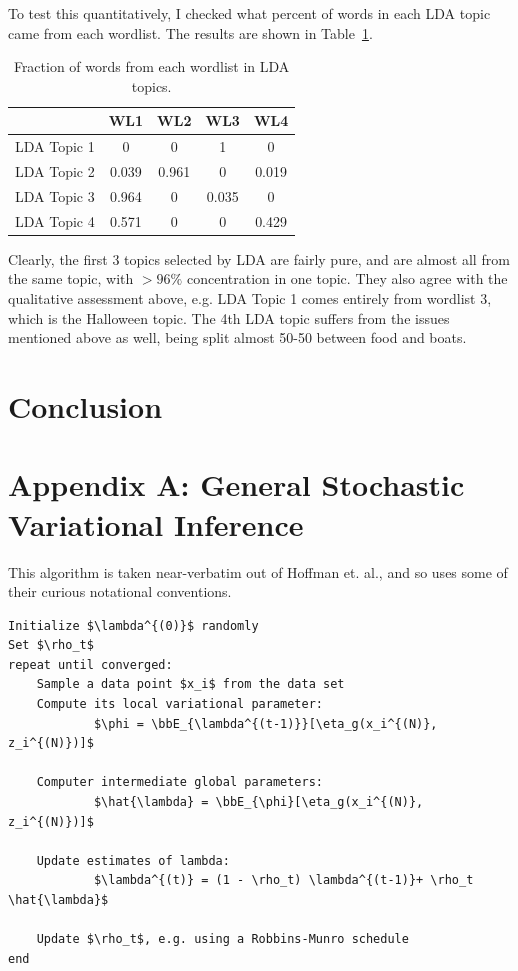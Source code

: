 \documentclass{article}
\newcommand{\bbE}{{\mathbb{E}}}
\begin{document}
To test this quantitatively, I checked what percent of words in each LDA topic
came from each wordlist. The results are shown in Table~\ref{tab:percents}. 

\begin{table}
  \centering
  \begin{tabular}{l|c|c|c|c|}
    & WL1 & WL2 & WL3 & WL4 \\ \hline \hline
    LDA Topic 1 &  0 & 0 & 1 & 0 \\ \hline
    LDA Topic 2 & 0.039 & 0.961 & 0 & 0.019\\ \hline
    LDA Topic 3 & 0.964 & 0 & 0.035 & 0 \\ \hline
    LDA Topic 4 & 0.571 & 0 & 0 & 0.429
  \end{tabular}
  \caption{Fraction of words from each wordlist in LDA topics.}
  \label{tab:percents}
\end{table}

Clearly, the first 3 topics selected by LDA are fairly pure, and are almost all
from the same topic, with $>96\%$ concentration in one topic. They also agree
with the qualitative assessment above, e.g. LDA Topic 1 comes entirely from
wordlist 3, which is the Halloween topic. The 4th LDA topic suffers from the
issues mentioned above as well, being split almost 50-50 between food and boats.

\section{Conclusion}

\newpage


\section{Appendix A: General Stochastic Variational Inference}

This algorithm is taken near-verbatim out of Hoffman et. al., and so uses some
of their curious notational conventions.

\begin{lstlisting}[mathescape=true, keywords={}]
Initialize $\lambda^{(0)}$ randomly
Set $\rho_t$
repeat until converged:
	Sample a data point $x_i$ from the data set
	Compute its local variational parameter:
			$\phi = \bbE_{\lambda^{(t-1)}}[\eta_g(x_i^{(N)}, z_i^{(N)})]$

	Computer intermediate global parameters:
			$\hat{\lambda} = \bbE_{\phi}[\eta_g(x_i^{(N)}, z_i^{(N)})]$

	Update estimates of lambda:
			$\lambda^{(t)} = (1 - \rho_t) \lambda^{(t-1)}+ \rho_t \hat{\lambda}$

	Update $\rho_t$, e.g. using a Robbins-Munro schedule
end
\end{lstlisting}
\end{document}
